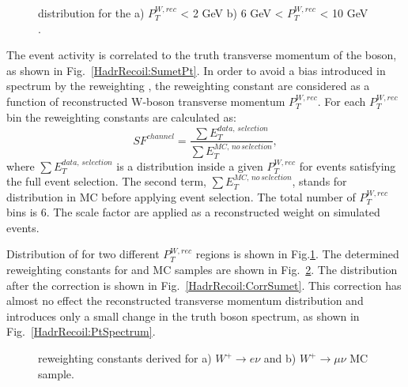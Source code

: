 \begin{figure}[!tbp]
\begin{minipage}[h]{0.49\linewidth}
\end{minipage}
\hfill
\begin{minipage}[h]{0.49\linewidth}
\end{minipage}
\caption{\sumet distribution for the a) $P_T^{W, rec}$ < 2 GeV b) 6 GeV < $P_T^{W, rec}$ < 10 GeV .}
\label{ris:SumEtCorPtW}
\end{figure}


The event activity \sumet is correlated to the truth transverse momentum of the boson, as shown in Fig.~\ref{HadrRecoil:SumetPt}.  In order to avoid a bias introduced in \ptw spectrum by the reweighting , the reweighting constant are considered as a function of reconstructed W-boson transverse momentum $P_T^{W, rec}$. For each $P_T^{W, rec}$ bin the reweighting constants are calculated as:
\begin{equation}
SF^{channel}=\frac{\sum E_T^{data, \, selection} }{\sum E_T^{MC,\, no\, selection} },
\end{equation}
where $\sum E_T^{data,\, selection} $ is a \sumet distribution inside a given $P_T^{W, rec}$ for events satisfying the full event selection. The second term, $\sum E_T^{MC,\, no\, selection}$, stands for \sumet distribution in MC before applying event selection. The total number of $P_T^{W, rec}$ bins is 6. The scale factor are applied as a reconstructed weight on simulated events.

Distribution of \sumet for two different $P_T^{W, rec}$ regions is shown in Fig.\ref{ris:SumEtCorPtW}. The determined reweighting constants for \wenu and \wmunu MC samples are shown in Fig.~\ref{ris:SumEtCorNoPol}. The \sumet distribution after the correction is shown in Fig.~\ref{HadrRecoil:CorrSumet}. This correction has almost no effect the reconstructed transverse momentum distribution and introduces only a small change in the truth boson spectrum, as shown in Fig.~\ref{HadrRecoil:PtSpectrum}. 


\begin{figure}[!tbp]
\begin{minipage}[h]{0.49\linewidth}
\end{minipage}
\hfill
\begin{minipage}[h]{0.49\linewidth}
\end{minipage}
\caption{\sumet reweighting constants derived for a) $W^{+} \to e \nu$ and b) $W^{+} \to \mu \nu$ MC sample.}
\label{ris:SumEtCorNoPol}
\end{figure}


